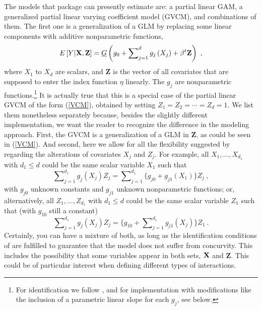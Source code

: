 The models that package  can presently estimate are: 
a partial linear GAM, a generalized partial linear varying coefficient 
model (GVCM), and combinations of them. The first one is a generalization of a GLM by replacing some linear components with additive nonparametric functions, 
\begin{equation*} \label{eq3}
E \left[ {Y\vert {\bf X},{\bf Z}} \right] = \underline{G} \left( {g_0 + \sum\nolimits_{j = 1}^d g_j \left( {X_j } \right) + \beta^t {\mathbf Z} } \right) \ ,
\end{equation*}
where  $X_1$ to $X_d$ are scalars, and ${\mathbf Z}$ is the vector of all covariates that are supposed to enter the index function $\eta$ linearly. The $g_j $ are nonparametric functions.\footnote{%
	For identification we follow \cite{LMP2012}, and \cite{RS2010} for implementation with  modifications like the inclusion of a parametric linear slope for each $g_j$, see below.}
It is actually true that this is a special case of the partial linear GVCM of the form (\ref{VCM}), obtained by setting $Z_1=Z_2=\cdots =Z_d=1$. We list them nonetheless separately because, besides the slightly different implementation, we want the reader to recognize the difference in the modeling approach.     
First, the GVCM is a generalization of a GLM in ${\mathbf Z}$, as could be seen in (\ref{VCM}).  
And second, here we allow for all the flexibility suggested by \cite{LMP2012} regarding the alterations of covariates $X_j$ and $Z_j$.
For example, all $X_1,\ldots ,X_{d_1}$ with $d_1\le d$ 
could be the same scalar variable $X_1$ such that  
\begin{equation} \label{eq51}
\sum\nolimits_{j = 1}^{d_1} g_j \left( {X_j } \right) Z_j  =
\sum\nolimits_{j = 1}^{d_1} \big\{ g_{j0} + g_{j1} \left( {X_1 } \right) \big\} Z_j   \ ,
\end{equation}
with $g_{j0}$ unknown constants and $g_{j1}$ unknown nonparametric functions;
or, alternatively, all $Z_1,\ldots ,Z_{d_1}$ with $d_1\le d$ 
could be the same scalar variable $Z_1$ such that  (with $g_{10}$ still a constant)
\begin{equation} \label{eq52}
\sum\nolimits_{j = 1}^{d_1} g_j \left( {X_j } \right) Z_j  =
\big\{ g_{10} + \sum\nolimits_{j = 1}^{d_1} g_{j1} \left( {X_j } \right) \big\} Z_1   \ .
\end{equation}
Certainly, you can have a mixture of both, as long as the identification conditions of \cite{LMP2012} are fulfilled to guarantee that the model does not suffer from concurvity. This includes the possibility that some variables appear in both sets, ${\bf {X}}$ and ${\mathbf Z}$. This could be of particular interest when defining different types of interactions. 


